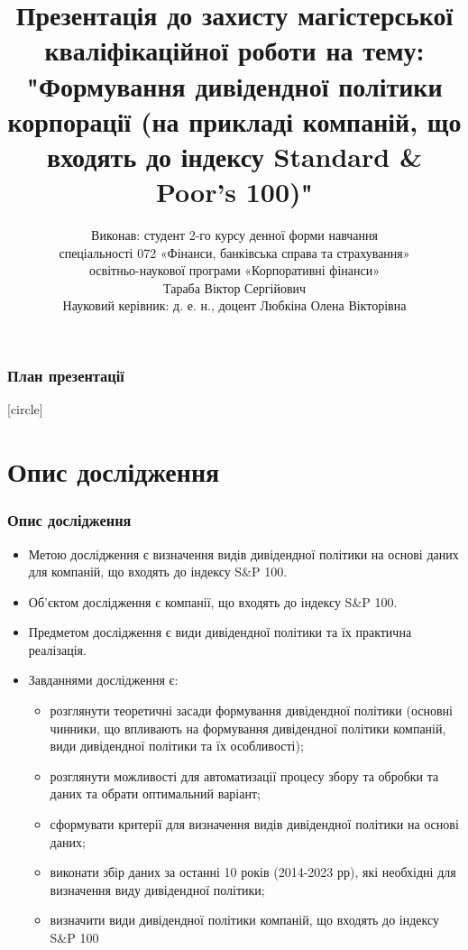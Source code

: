\documentclass[aspectratio=169]{beamer}
\title{Презентація до захисту магістерської\\кваліфікаційної роботи на тему:\\ "Формування дивідендної політики корпорації (на прикладі компаній, що входять до індексу Standard \& Poor's 100)"}
\author{Виконав: студент 2-го курсу денної форми навчання 
\\спеціальності 072 «Фінанси, банківська справа та страхування»
\\освітньо-наукової програми
«Корпоративні фінанси» \\
Тараба Віктор Сергійович\\ Науковий керівник: д. е. н., доцент Любкіна Олена Вікторівна}
\institute{Київський національний університет імені Тараса Шевченка\\Економічний факультет\\Кафедра фінансів}
\begin{document}
	
\begin{frame}
\titlepage
\end{frame}

\begin{frame}
\frametitle{План презентації}
[circle]
\tableofcontents
\end{frame}

\section{Опис дослідження}

\begin{frame}
\frametitle{Опис дослідження}
\begin{itemize}
\item \alert {Метою дослідження} є визначення видів дивідендної політики на основі даних для компаній, що входять до індексу S\&P 100.
\tinyskip
\item \alert {Об’єктом дослідження} є компанії, що входять до індексу S\&P 100.
\tinyskip
\item \alert {Предметом дослідження} є види дивідендної політики та їх практична реалізація.
\tinyskip
\item \alert {Завданнями дослідження} є:
\begin{itemize}
    \item[\textcolor{orange}{\textbullet}] розглянути теоретичні засади формування дивідендної політики (основні чинники, що впливають на формування дивідендної політики компаній, види дивідендної політики та їх особливості); 
    \item[\textcolor{orange}{\textbullet}] розглянути можливості для автоматизації процесу збору та обробки та даних та обрати оптимальний варіант; 
    \item[\textcolor{orange}{\textbullet}] сформувати критерії для визначення видів дивідендної політики на основі даних;
    \item[\textcolor{orange}{\textbullet}] виконати збір даних за останні 10 років (2014-2023 рр), які необхідні для визначення виду дивідендної політики;
    \item[\textcolor{orange}{\textbullet}] визначити види дивідендної політики компаній, що входять до індексу S\&P 100
\end{itemize}
\end{itemize}
\end{frame}
\end{document}
